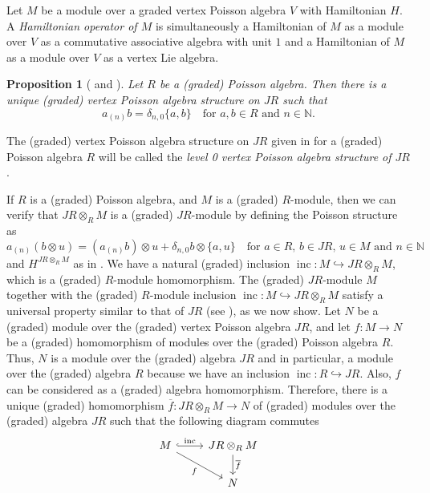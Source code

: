 \documentclass[a4paper, 12pt, reqno]{amsart}
\newtheorem{proposition}[theorem]{Proposition}
\theoremstyle{remark}
\DeclareMathOperator{\inc}{inc}
\begin{document}
Let $M$ be a module over a graded vertex Poisson algebra $V$ with Hamiltonian $H$.
A \emph{Hamiltonian operator of $M$} is simultaneously a Hamiltonian of $M$ as a module over $V$ as a commutative associative algebra with unit $1$ and a Hamiltonian of $M$ as a module over $V$ as a vertex Lie algebra.

\begin{proposition}[{\cite[Proposition 2.3.1]{arakawa_remark_2012}} and {}]
  \label{prp:4}
  Let $R$ be a (graded) Poisson algebra.
  Then there is a unique (graded) vertex Poisson algebra structure on $JR$ such that
  \begin{equation*}
    a_{(n)}b = \delta_{n, 0}\{a, b\} \quad \text{for $a, b \in R$ and $n \in \mathbb{N}$}.
  \end{equation*}
\end{proposition}

The (graded) vertex Poisson algebra structure on $JR$ given in  for a (graded) Poisson algebra $R$ will be called the \emph{level 0 vertex Poisson algebra structure of $JR$}.

If $R$ is a (graded) Poisson algebra, and $M$ is a (graded) $R$-module, then we can verify that $JR \otimes_R M$ is a (graded) $JR$-module by defining the Poisson structure as
\begin{equation*}
  a_{(n)}(b\otimes u) = (a_{(n)}b)\otimes u + \delta_{n, 0}b\otimes\{a, u\} \quad \text{for $a \in R$, $b \in JR$, $u \in M$ and $n \in \mathbb{N}$}
\end{equation*}
and $H^{JR \otimes_R M}$ as in .
We have a natural (graded) inclusion $\inc: M \hookrightarrow JR \otimes_R M$, which is a (graded) $R$-module homomorphism.
The (graded) $JR$-module $M$ together with the (graded) $R$-module inclusion $\inc: M \hookrightarrow JR \otimes_R M$ satisfy a universal property similar to that of $JR$ (see ), as we now show.
Let $N$ be a (graded) module over the (graded) vertex Poisson algebra $JR$, and let $f: M \to N$ be a (graded) homomorphism of modules over the (graded) Poisson algebra $R$.
Thus, $N$ is a module over the (graded) algebra $JR$ and in particular, a module over the (graded) algebra $R$ because we have an inclusion $\inc: R \hookrightarrow JR$.
Also, $f$ can be considered as a (graded) algebra homomorphism.
Therefore, there is a unique (graded) homomorphism $\overline{f}: JR \otimes_R M \to N$ of (graded) modules over the (graded) algebra $JR$ such that the following diagram commutes
\begin{equation*}
  \begin{tikzcd}
    M \arrow[r, "\inc", hook] \arrow[rd, "f"'] & JR \otimes_R M \arrow[d, "\overline{f}"] \\
    & N
  \end{tikzcd}
\end{equation*}
\end{document}
